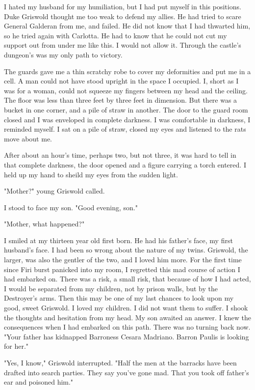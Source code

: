 \documentclass{article}
\begin{document}
I hated my husband for my humiliation, but I had put myself in this positions. Duke Griswold thought me too weak to defend my allies. He had tried to scare General Galderan from me, and failed. He did not know that I had thwarted him, so he tried again with Carlotta. He had to know that he could not cut my support out from under me like this. I would not allow it. Through the castle's dungeon's was my only path to victory.

The guards gave me a thin scratchy robe to cover my deformities and put me in a cell. A man could not have stood upright in the space I occupied. I, short as I was for a woman, could not squeeze my fingers between my head and the ceiling. The floor was less than three feet by three feet in dimension. But there was a bucket in one corner, and a pile of straw in another. The door to the guard room closed and I was enveloped in complete darkness. I was comfortable in darkness, I reminded myself. I sat on a pile of straw, closed my eyes and listened to the rats move about me. 

After about an hour's time, perhaps two, but not three, it was hard to tell in that complete darkness, the door opened and a figure carrying a torch entered. I held up my hand to sheild my eyes from the sudden light. 

"Mother?" young Griswold called.

I stood to face my son. "Good evening, son."

"Mother, what happened?"

I smiled at my thirteen year old first born. He had his father's face, my first husband's face. I had been so wrong about the nature of my twins. Griswold, the larger, was also the gentler of the two, and I loved him more. For the first time since Firi burst panicked into my room, I regretted this mad course of action I had embarked on. There was a risk, a small risk, that because of how I had acted, I would be separated from my children, not by prison walls, but by the Destroyer's arms. Then this may be one of my last chances to look upon my good, sweet Griswold. I loved my children. I did not want them to suffer. I shook the thoughts and hesitation from my head. My son awaited an answer. I knew the consequences when I had embarked on this path. There was no turning back now. "Your father has kidnapped Barroness Cesara Madriano. Barron Paulis is looking for her."

"Yes, I know," Griswold interrupted. "Half the men at the barracks have been drafted into search parties. They say you've gone mad. That you took off father's ear and poisoned him."
\end{document}
